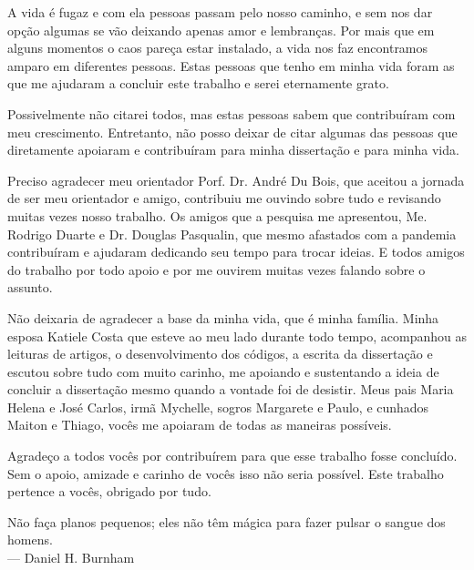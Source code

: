 \documentclass[diss,capa]{texufpel}
\begin{document}
\begin{agradecimentos}
  A vida é fugaz e com ela pessoas passam pelo nosso caminho, e sem nos dar opção algumas se vão deixando apenas amor e lembranças. Por mais que em alguns momentos o caos pareça estar instalado, a vida nos faz encontramos amparo em diferentes pessoas. Estas pessoas que tenho em minha vida foram as que me ajudaram a concluir este trabalho e serei eternamente grato.

  \vspace*{0.5cm}

  Possivelmente não citarei todos, mas estas pessoas sabem que contribuíram com meu crescimento. Entretanto, não posso deixar de citar algumas das pessoas que diretamente apoiaram e contribuíram para minha dissertação e para minha vida.

  \vspace*{0.5cm}

  Preciso agradecer meu orientador Porf. Dr. André Du Bois, que aceitou a jornada de ser meu orientador e amigo, contribuiu me ouvindo sobre tudo e revisando muitas vezes nosso trabalho. Os amigos que a pesquisa me apresentou, Me. Rodrigo Duarte e Dr. Douglas Pasqualin, que mesmo afastados com a pandemia contribuíram e ajudaram dedicando seu tempo para trocar ideias. E todos amigos do trabalho por todo apoio e por me ouvirem muitas vezes falando sobre o assunto.

  \vspace*{0.5cm}

  Não deixaria de agradecer a base da minha vida, que é minha família. Minha esposa Katiele Costa que esteve ao meu lado durante todo tempo, acompanhou as leituras de artigos, o desenvolvimento dos códigos, a escrita da dissertação e escutou sobre tudo com muito carinho, me apoiando e sustentando a ideia de concluir a dissertação mesmo quando a vontade foi de desistir. Meus pais Maria Helena e José Carlos, irmã Mychelle, sogros Margarete e Paulo, e cunhados Maiton e Thiago, vocês me apoiaram de todas as maneiras possíveis.

  \vspace*{0.5cm}

  Agradeço a todos vocês por contribuírem para que esse trabalho fosse concluído. Sem o apoio, amizade e carinho de vocês isso não seria possível. Este trabalho pertence a vocês, obrigado por tudo.
\end{agradecimentos}

\begin{epigrafe}
  Não faça planos pequenos; eles não têm mágica para fazer pulsar o sangue dos homens.\\
  {\sc --- Daniel H. Burnham}
\end{epigrafe}
\end{document}
